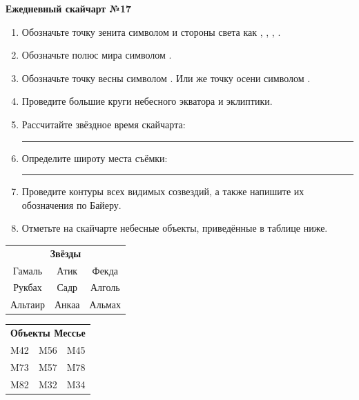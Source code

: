 \documentclass{./SAS-class-skygen}
\begin{document}
    
    
    
	\begin{center}
		\large\textbf{Ежедневный скайчарт №17}
	\end{center}

	\begin{enumerate}
		\item Обозначьте точку зенита символом  и стороны света как , , , .
		\item Обозначьте полюс мира символом .
		\item Обозначьте точку весны символом \Aries. Или же точку осени символом \Libra.
		\item Проведите большие круги небесного экватора и эклиптики.
		\item Рассчитайте звёздное время скайчарта: \rule{2cm}{0.4pt}
		\item Определите широту места съёмки: \rule{2cm}{0.4pt}
		\item Проведите контуры всех видимых созвездий, а также напишите их обозначения по Байеру.
		\item Отметьте на скайчарте небесные объекты, приведённые в таблице ниже.
	\end{enumerate}
	
    \vspace{0.5cm}

    \begin{table}[h!]
    \centering
    \begin{tabular}{ccc}
    \multicolumn{3}{c}{\textbf{Звёзды}} \\ Гамаль & Атик & Фекда \\
Рукбах & Садр & Алголь \\
Альтаир & Анкаа & Альмах \\

\end{tabular}
    \hfill
    \begin{tabular}{ccc}
    \multicolumn{3}{c}{\textbf{Объекты Мессье}} \\ M42 & M56 & M45 \\
M73 & M57 & M78 \\
M82 & M32 & M34 \\

\end{tabular}
    \end{table}
	
\end{document}
